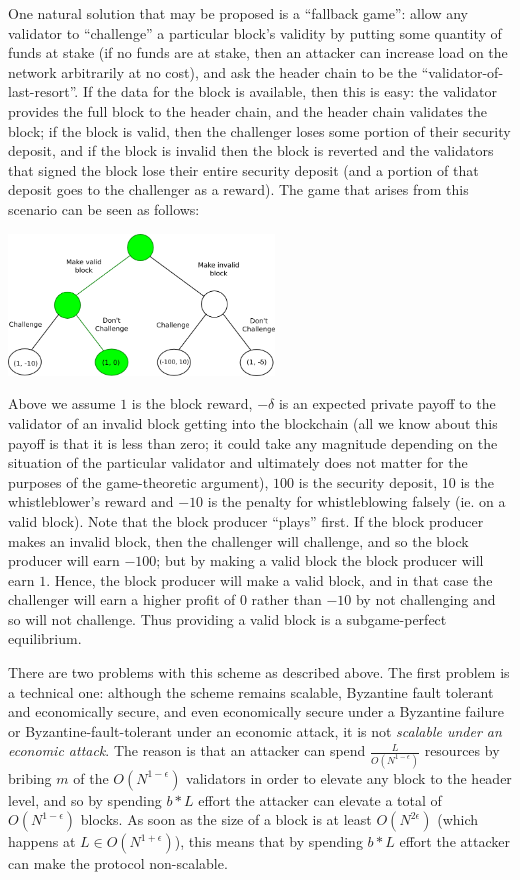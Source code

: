 \documentclass[11pt,a4paper]{report}
\theoremstyle{plain}
\theoremstyle{definition}
\theoremstyle{remark}
\begin{document}
One natural solution that may be proposed is a ``fallback game'': allow any validator to ``challenge'' a particular block's validity by putting some quantity of funds at stake (if no funds are at stake, then an attacker can increase load on the network arbitrarily at no cost), and ask the header chain to be the ``validator-of-last-resort''. If the data for the block is available, then this is easy: the validator provides the full block to the header chain, and the header chain validates the block; if the block is valid, then the challenger loses some portion of their security deposit, and if the block is invalid then the block is reverted and the validators that signed the block lose their entire security deposit (and a portion of that deposit goes to the challenger as a reward). The game that arises from this scenario can be seen as follows:

\begin{center}
\includegraphics[width=200pt]{game.png}
\end{center}

Above we assume $1$ is the block reward, $-\delta$ is an expected private payoff to the validator of an invalid block getting into the blockchain (all we know about this payoff is that it is less than zero; it could take any magnitude depending on the situation of the particular validator and ultimately does not matter for the purposes of the game-theoretic argument), $100$ is the security deposit, $10$ is the whistleblower's reward and $-10$ is the penalty for whistleblowing falsely (ie. on a valid block). Note that the block producer ``plays'' first. If the block producer makes an invalid block, then the challenger will challenge, and so the block producer will earn $-100$; but by making a valid block the block producer will earn $1$. Hence, the block producer will make a valid block, and in that case the challenger will earn a higher profit of $0$ rather than $-10$ by not challenging and so will not challenge. Thus providing a valid block is a subgame-perfect equilibrium.

There are two problems with this scheme as described above. The first problem is a technical one: although the scheme remains scalable, Byzantine fault tolerant and economically secure, and even economically secure under a Byzantine failure or Byzantine-fault-tolerant under an economic attack, it is not \emph{scalable under an economic attack}. The reason is that an attacker can spend $\frac{L}{O(N^{1-\epsilon})}$ resources by bribing $m$ of the $O(N^{1-\epsilon})$ validators in order to elevate any block to the header level, and so by spending $b * L$ effort the attacker can elevate a total of $O(N^{1-\epsilon})$ blocks. As soon as the size of a block is at least $O(N^{2\epsilon})$ (which happens at $L \in O(N^{1+\epsilon})$), this means that by spending $b * L$ effort the attacker can make the protocol non-scalable.
\end{document}
